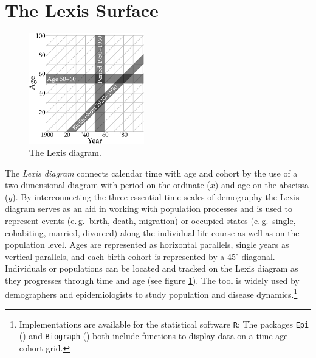 \documentclass[a4paper]{scrartcl}
\begin{document}
\section*{The Lexis Surface}

\begin{figure}
  \centering
  \includegraphics[width = 5cm]{../fig/plot-lexis_exmpl.pdf}
  \caption{The Lexis diagram.}
  \label{fig:lexis_exmpl}
\end{figure}

The \emph{Lexis diagram} connects calendar time with age and cohort by the use of a two dimensional diagram with period on the ordinate ($x$) and age on the abscissa ($y$). By interconnecting the three essential time-scales of demography the Lexis diagram serves as an aid in working with population processes and is used to represent events (e.\,g.~birth, death, migration) or occupied states (e.\,g.~single, cohabiting, married, divorced) along the individual life course as well as on the population level. Ages are represented as horizontal parallels, single years as vertical parallels, and each birth cohort is represented by a 45$^\circ$ diagonal. Individuals or populations can be located and tracked on the Lexis diagram as they progresses through time and age (see figure \ref{fig:lexis_exmpl}). The tool is widely used by demographers and epidemiologists to study population and disease dynamics.\footnote{Implementations are available for the statistical software \texttt{R}: The packages \texttt{Epi} (\cite{Carstensen2014}) and \texttt{Biograph} (\cite{Willekens2013b}) both include functions to display data on a time-age-cohort grid.}
\end{document}
